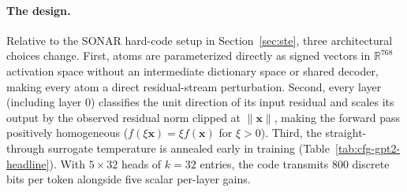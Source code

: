 \paragraph{The design.} Relative to the SONAR hard-code setup in
Section~\ref{sec:ste}, three architectural choices change. First, atoms are
parameterized directly as signed vectors in $\mathbb{R}^{768}$ activation
space without an intermediate dictionary space or shared decoder, making
every atom a direct residual-stream perturbation. Second, every layer
(including layer 0) classifies the unit direction of its input residual and
scales its output by the observed residual norm clipped at
$\lVert\mathbf{x}\rVert$, making the forward pass positively homogeneous
($f(\xi\mathbf{x}) = \xi f(\mathbf{x})$ for $\xi > 0$). Third, the
straight-through surrogate temperature is annealed early in training
(Table~\ref{tab:cfg-gpt2-headline}). With $5\times32$ heads of $k{=}32$
entries, the code transmits 800 discrete bits per token alongside five scalar
per-layer gains.

